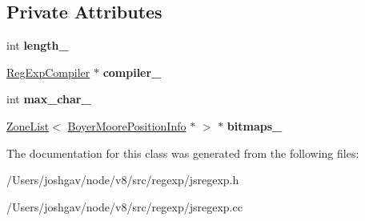 \subsection*{Private Attributes}
\begin{DoxyCompactItemize}
\item 
int {\bfseries length\+\_\+}\hypertarget{classv8_1_1internal_1_1_boyer_moore_lookahead_afa52b264f0331523887415a3d7fa0c77}{}\label{classv8_1_1internal_1_1_boyer_moore_lookahead_afa52b264f0331523887415a3d7fa0c77}

\item 
\hyperlink{classv8_1_1internal_1_1_reg_exp_compiler}{Reg\+Exp\+Compiler} $\ast$ {\bfseries compiler\+\_\+}\hypertarget{classv8_1_1internal_1_1_boyer_moore_lookahead_a7573d38c150f142eff26f7ee645e5141}{}\label{classv8_1_1internal_1_1_boyer_moore_lookahead_a7573d38c150f142eff26f7ee645e5141}

\item 
int {\bfseries max\+\_\+char\+\_\+}\hypertarget{classv8_1_1internal_1_1_boyer_moore_lookahead_ab801c31a7d225a369f086bce36169030}{}\label{classv8_1_1internal_1_1_boyer_moore_lookahead_ab801c31a7d225a369f086bce36169030}

\item 
\hyperlink{classv8_1_1internal_1_1_zone_list}{Zone\+List}$<$ \hyperlink{classv8_1_1internal_1_1_boyer_moore_position_info}{Boyer\+Moore\+Position\+Info} $\ast$ $>$ $\ast$ {\bfseries bitmaps\+\_\+}\hypertarget{classv8_1_1internal_1_1_boyer_moore_lookahead_a32699010f4b00592f1866255f51ed8d3}{}\label{classv8_1_1internal_1_1_boyer_moore_lookahead_a32699010f4b00592f1866255f51ed8d3}

\end{DoxyCompactItemize}


The documentation for this class was generated from the following files\+:\begin{DoxyCompactItemize}
\item 
/\+Users/joshgav/node/v8/src/regexp/jsregexp.\+h\item 
/\+Users/joshgav/node/v8/src/regexp/jsregexp.\+cc\end{DoxyCompactItemize}
